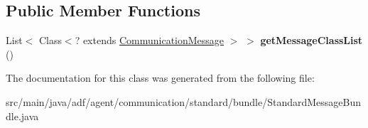 \subsection*{Public Member Functions}
\begin{DoxyCompactItemize}
\item 
\hypertarget{classadf_1_1agent_1_1communication_1_1standard_1_1bundle_1_1StandardMessageBundle_a2f5c4a6d19b46062119a697d66821292}{}\label{classadf_1_1agent_1_1communication_1_1standard_1_1bundle_1_1StandardMessageBundle_a2f5c4a6d19b46062119a697d66821292} 
List$<$ Class$<$? extends \hyperlink{classadf_1_1component_1_1communication_1_1CommunicationMessage}{Communication\+Message} $>$ $>$ {\bfseries get\+Message\+Class\+List} ()
\end{DoxyCompactItemize}


The documentation for this class was generated from the following file\+:\begin{DoxyCompactItemize}
\item 
src/main/java/adf/agent/communication/standard/bundle/Standard\+Message\+Bundle.\+java\end{DoxyCompactItemize}
